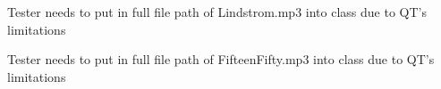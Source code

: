 
\begin{DoxyRefList}
\item[\label{bug__bug000001}%
\hypertarget{bug__bug000001}{}%
Member \hyperlink{class_game_screen_a61ac084a564d45be53337cc364214a60}{Game\-Screen\-:\-:Game\-Screen} (Q\-Widget $\ast$parent=0)]Tester needs to put in full file path of Lindstrom.\-mp3 into class due to Q\-T's limitations  
\item[\label{bug__bug000002}%
\hypertarget{bug__bug000002}{}%
Member \hyperlink{class_main_window_a8b244be8b7b7db1b08de2a2acb9409db}{Main\-Window\-:\-:Main\-Window} (Q\-Widget $\ast$parent=0)]Tester needs to put in full file path of Fifteen\-Fifty.\-mp3 into class due to Q\-T's limitations 
\end{DoxyRefList}